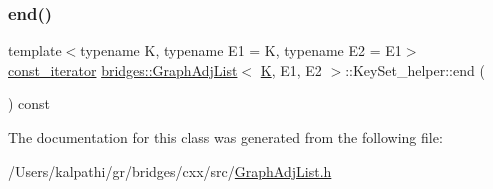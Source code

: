 \mbox{\label{classbridges_1_1_graph_adj_list_1_1_key_set__helper_a581dd1d192896998e9d24bfa694c9036}} 
\subsubsection{\texorpdfstring{end()}{end()}}
{\footnotesize\ttfamily template$<$typename K, typename E1 = K, typename E2 = E1$>$ \\
\mbox{\hyperlink{classbridges_1_1_graph_adj_list_1_1_key_set__helper_1_1const__iterator}{const\+\_\+iterator}} \mbox{\hyperlink{classbridges_1_1_graph_adj_list}{bridges\+::\+Graph\+Adj\+List}}$<$ \mbox{\hyperlink{namespacebridges_acfb0a4f7877d8f63de3e6862004c50edaa5f3c6a11b03839d46af9fb43c97c188}{K}}, E1, E2 $>$\+::Key\+Set\+\_\+helper\+::end (\begin{DoxyParamCaption}{ }\end{DoxyParamCaption}) const\hspace{0.3cm}{\ttfamily [inline]}}



The documentation for this class was generated from the following file\+:\begin{DoxyCompactItemize}
\item 
/\+Users/kalpathi/gr/bridges/cxx/src/\mbox{\hyperlink{_graph_adj_list_8h}{Graph\+Adj\+List.\+h}}\end{DoxyCompactItemize}
